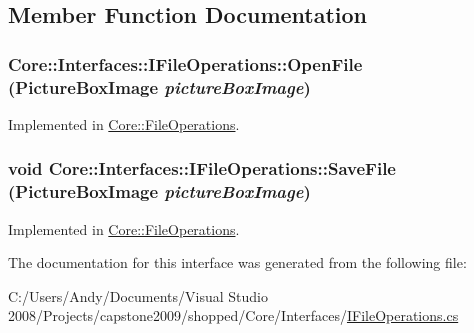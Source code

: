 \subsection{Member Function Documentation}
\hypertarget{interface_core_1_1_interfaces_1_1_i_file_operations_a373c3e1cc40a59b65e77cf9551463419}{
\subsubsection[{OpenFile}]{ Core::Interfaces::IFileOperations::OpenFile ({\bf PictureBoxImage} {\em pictureBoxImage})}}
\label{interface_core_1_1_interfaces_1_1_i_file_operations_a373c3e1cc40a59b65e77cf9551463419}


Implemented in \hyperlink{class_core_1_1_file_operations_a108130b2bd87d432c0fbbb4f6a42c662}{Core::FileOperations}.\hypertarget{interface_core_1_1_interfaces_1_1_i_file_operations_a254301628fd3053115f557626aa71f14}{
\subsubsection[{SaveFile}]{\setlength{\rightskip}{0pt plus 5cm}void Core::Interfaces::IFileOperations::SaveFile ({\bf PictureBoxImage} {\em pictureBoxImage})}}
\label{interface_core_1_1_interfaces_1_1_i_file_operations_a254301628fd3053115f557626aa71f14}


Implemented in \hyperlink{class_core_1_1_file_operations_a0fc5427e96d79e70c6409ec22e70abba}{Core::FileOperations}.

The documentation for this interface was generated from the following file:\begin{DoxyCompactItemize}
\item 
C:/Users/Andy/Documents/Visual Studio 2008/Projects/capstone2009/shopped/Core/Interfaces/\hyperlink{_i_file_operations_8cs}{IFileOperations.cs}\end{DoxyCompactItemize}
